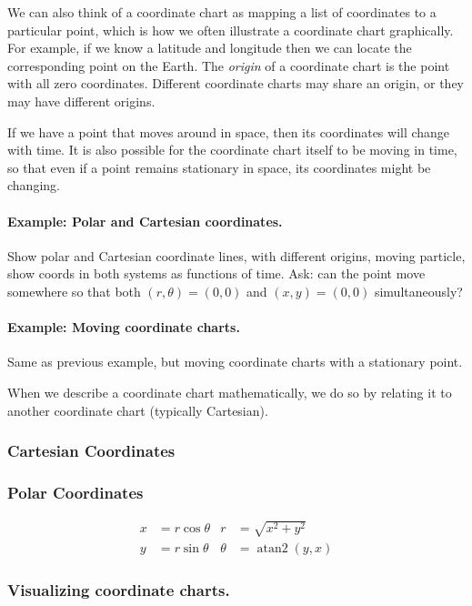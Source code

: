 \documentclass{article}
\begin{document}
We can also think of a coordinate chart as mapping a list of
coordinates to a particular point, which is how we often illustrate a
coordinate chart graphically. For example, if we know a latitude and
longitude then we can locate the corresponding point on the Earth. The
\emph{origin} of a coordinate chart is the point with all zero
coordinates. Different coordinate charts may share an origin, or they
may have different origins.

If we have a point that moves around in space, then its coordinates
will change with time. It is also possible for the coordinate chart
itself to be moving in time, so that even if a point remains
stationary in space, its coordinates might be changing.

\paragraph{Example: Polar and Cartesian coordinates.} Show polar and
Cartesian coordinate lines, with different origins, moving particle,
show coords in both systems as functions of time. Ask: can the point
move somewhere so that both $(r, \theta) = (0,0)$ and $(x,y) = (0,0)$
simultaneously?

\paragraph{Example: Moving coordinate charts.} Same as previous
example, but moving coordinate charts with a stationary point.

When we describe a coordinate chart mathematically, we do so by
relating it to another coordinate chart (typically Cartesian).

\subsubsection{Cartesian Coordinates}

\subsubsection{Polar Coordinates}

\begin{align}
  x &= r \cos\theta & r &= \sqrt{x^2 + y^2} \\
  y &= r \sin\theta & \theta &= \operatorname{atan2}(y, x)
\end{align}

\subsubsection{Visualizing coordinate charts.}
\end{document}
